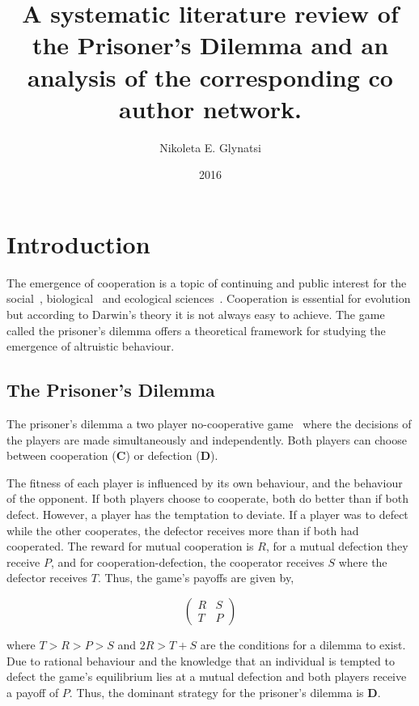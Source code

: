 \documentclass{article}
\title{A systematic literature review of the Prisoner's Dilemma and an analysis of the corresponding co author network.}
\author{Nikoleta E. Glynatsi}
\date{2016}
\begin{document}
\maketitle

\section{Introduction}\label{section:introduction}

The emergence of cooperation is a topic of continuing and public interest
for the social~\cite{capraro2014, gracia2012},
biological~\cite{Douglas2011}
and ecological sciences~\cite{Godfray1992,Krama2012,Milinski1987,Wilkinson1984}.
Cooperation is essential for evolution but according to Darwin's theory 
it is not always easy to achieve. The game called the prisoner's
dilemma offers a theoretical framework for studying the emergence of
altruistic behaviour.

\subsection{The Prisoner's Dilemma}\label{section:prisoners_dilemma}

The prisoner's dilemma a two player no-cooperative game~\cite{Flood1958} where 
the decisions of the players are made simultaneously and independently. Both players
can choose between cooperation (\textbf{C}) or defection (\textbf{D}).

The fitness of each player is influenced by its own behaviour, and the behaviour
of the opponent. If both players choose to cooperate, both do better
than if both defect. However, a player has the temptation to deviate. If a
player was to defect while the other cooperates, the defector receives
more than if both had cooperated. The reward for mutual cooperation is \(R\),
for a mutual defection they receive \(P\), and for cooperation-defection,
the cooperator receives \(S\) where the defector receives \(T\). Thus, the game's
payoffs are given by,

\begin{equation} \label{eq:the_pd_payoffs}
    \begin{pmatrix}
    R & S \\ T & P
    \end{pmatrix}
\end{equation}

where \(T > R > P > S \) and \(2R > T + S\) are the conditions for a dilemma
to exist. Due to rational behaviour and the knowledge that an individual is tempted
to defect the game's equilibrium lies at a mutual defection and both players
receive a payoff of \(P\). Thus, the dominant strategy for the prisoner's dilemma
is \textbf{D}.
\end{document}
